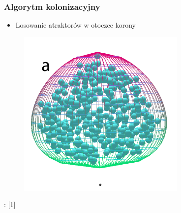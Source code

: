 \documentclass[blue,table]{beamer}
\begin{document}
\begin{frame}\frametitle{Algorytm kolonizacyjny}
\begin{itemize}
\item{Losowanie atraktorów w otoczce korony}
\end{itemize}
\begin{figure}
\includegraphics[scale=0.5]{img/colonization_1.png} 
\end{figure}
\begin{footnotesize}
: [1]
\end{footnotesize}
\end{frame}
\end{document}
